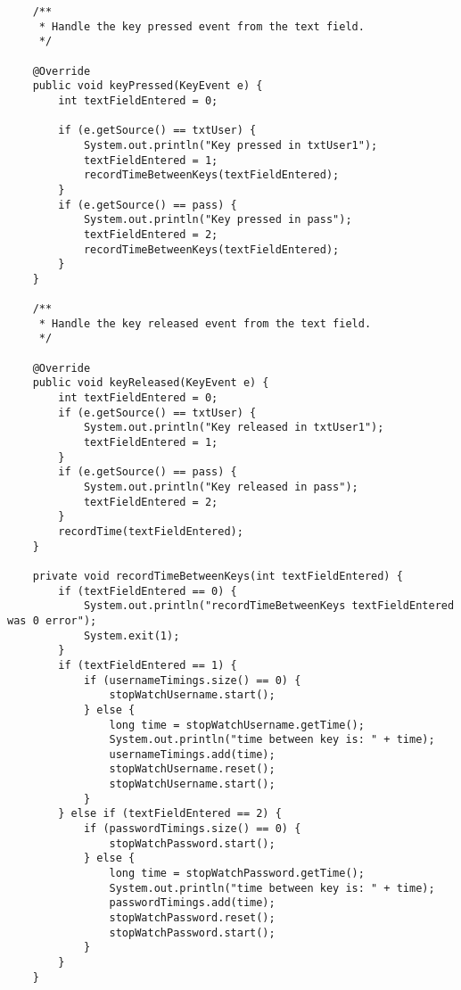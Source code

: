 \documentclass{article}
\begin{document}
\begin{lstlisting}
    /**
     * Handle the key pressed event from the text field.
     */

    @Override
    public void keyPressed(KeyEvent e) {
        int textFieldEntered = 0;

        if (e.getSource() == txtUser) {
            System.out.println("Key pressed in txtUser1");
            textFieldEntered = 1;
            recordTimeBetweenKeys(textFieldEntered);
        }
        if (e.getSource() == pass) {
            System.out.println("Key pressed in pass");
            textFieldEntered = 2;
            recordTimeBetweenKeys(textFieldEntered);
        }
    }

    /**
     * Handle the key released event from the text field.
     */

    @Override
    public void keyReleased(KeyEvent e) {
        int textFieldEntered = 0;
        if (e.getSource() == txtUser) {
            System.out.println("Key released in txtUser1");
            textFieldEntered = 1;
        }
        if (e.getSource() == pass) {
            System.out.println("Key released in pass");
            textFieldEntered = 2;
        }
        recordTime(textFieldEntered);
    }

    private void recordTimeBetweenKeys(int textFieldEntered) {
        if (textFieldEntered == 0) {
            System.out.println("recordTimeBetweenKeys textFieldEntered was 0 error");
            System.exit(1);
        }
        if (textFieldEntered == 1) {
            if (usernameTimings.size() == 0) {
                stopWatchUsername.start();
            } else {
                long time = stopWatchUsername.getTime();
                System.out.println("time between key is: " + time);
                usernameTimings.add(time);
                stopWatchUsername.reset();
                stopWatchUsername.start();
            }
        } else if (textFieldEntered == 2) {
            if (passwordTimings.size() == 0) {
                stopWatchPassword.start();
            } else {
                long time = stopWatchPassword.getTime();
                System.out.println("time between key is: " + time);
                passwordTimings.add(time);
                stopWatchPassword.reset();
                stopWatchPassword.start();
            }
        }
    }



\end{lstlisting}
\end{document}
